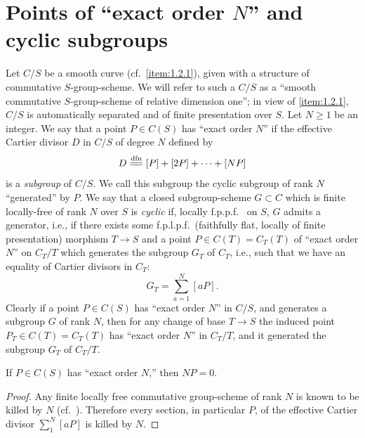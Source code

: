 \section{Points of ``exact order $N$'' and cyclic subgroups}
\label{sec:1.4}

\kmitem\label{item:1.4.1}
Let $C/S$ be a smooth curve (cf.~\ref{item:1.2.1}), given with a structure of commutative $S$-group-scheme. We will refer to such a $C/S$ as a ``smooth commutative $S$-group-scheme of relative dimension one''; in view of \ref{item:1.2.1}, $C/S$ is automatically separated and of finite presentation over $S$. Let $N \ge 1$ be an integer. We say that a point $P \in C(S)$ has ``exact order $N$'' if the effective Cartier divisor $D$ in $C/S$ of degree $N$ defined by
\begin{equation}\label{eq:1.4.1.1}
D \xlongequal{dfn} [P] + [2P] + \cdots + [NP]
\end{equation}
is a \emph{subgroup} of $C/S$. We call this subgroup the cyclic subgroup of rank $N$ ``generated'' by $P$. We say that a closed subgroup-scheme $G \subset C$ which is finite locally-free of rank $N$ over $S$ is \emph{cyclic} if, locally f.p.p.f.\ \cite[III, Exp.~IV, 6.3]{SGA} on $S$, $G$ admits a generator, i.e., if there exists some f.p.l.p.f.\ (faithfully flat, locally of finite presentation) morphism $T \to S$ and a point $P \in C(T) = C_T(T)$ of ``exact order $N$'' on $C_T/T$ which generates the subgroup $G_T$ of $C_T$, i.e., such that we have an equality of Cartier divisors in $C_T$:
\begin{equation}\label{eq:1.4.1.2}
G_T = \sum_{a=1}^{N} [aP].
\end{equation}
Clearly if a point $P \in C(S)$ has ``exact order $N$'' in $C/S$, and generates a subgroup $G$ of rank $N$, then for any change of base $T \to S$ the induced point $P_T \in C(T) = C_T(T)$ has ``exact order $N$'' in $C_T/T$, and it generated the subgroup $G_T$ of $C_T/T$.

\begin{lemma}\label{lem:1.4.2}
If $P \in C(S)$ has ``exact order $N$,'' then $NP = 0$.
\end{lemma}

\begin{proof}
Any finite locally free commutative group-scheme of rank $N$ is known to be killed by $N$ (cf.~\cite{OortTate}). Therefore every section, in particular $P$, of the effective Cartier divisor $\sum_{1}^{N} [aP]$ is killed by $N$.
\end{proof}

